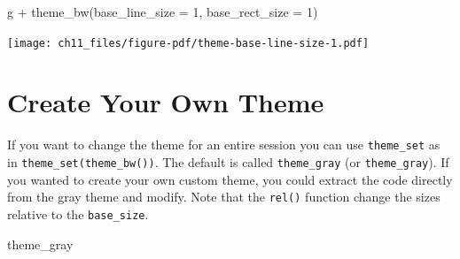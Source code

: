 \documentclass[
  letterpaper,
  DIV=11,
  numbers=noendperiod]{scrreprt}
\newenvironment{Shaded}{\begin{snugshade}}{\end{snugshade}}
\newcommand{\AttributeTok}[1]{\textcolor[rgb]{0.40,0.45,0.13}{#1}}
\newcommand{\DecValTok}[1]{\textcolor[rgb]{0.68,0.00,0.00}{#1}}
\newcommand{\FunctionTok}[1]{\textcolor[rgb]{0.28,0.35,0.67}{#1}}
\newcommand{\NormalTok}[1]{\textcolor[rgb]{0.00,0.23,0.31}{#1}}
\newcommand{\SpecialCharTok}[1]{\textcolor[rgb]{0.37,0.37,0.37}{#1}}
\begin{document}
\begin{Shaded}
\begin{Highlighting}[]
\NormalTok{g }\SpecialCharTok{+} \FunctionTok{theme\_bw}\NormalTok{(}\AttributeTok{base\_line\_size =} \DecValTok{1}\NormalTok{, }\AttributeTok{base\_rect\_size =} \DecValTok{1}\NormalTok{)}
\end{Highlighting}
\end{Shaded}

\texttt{[image: ch11\_files/figure-pdf/theme-base-line-size-1.pdf]}

\section{Create Your Own Theme}\label{create-your-own-theme}

If you want to change the theme for an entire session you can use
\texttt{theme\_set} as in \texttt{theme\_set(theme\_bw())}. The default
is called \texttt{theme\_gray} (or \texttt{theme\_gray}). If you wanted
to create your own custom theme, you could extract the code directly
from the gray theme and modify. Note that the \texttt{rel()} function
change the sizes relative to the \texttt{base\_size}.

\begin{Shaded}
\begin{Highlighting}[]
\NormalTok{theme\_gray}
\end{Highlighting}
\end{Shaded}
\end{document}
